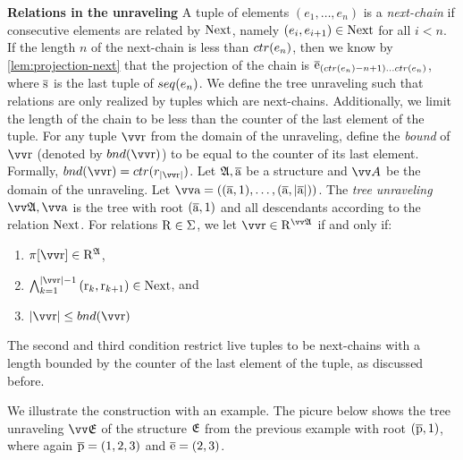 \noindent
\textbf{Relations in the unraveling}
A tuple of elements $(e_{1}, \ldots, e_{n})$ is a \emph{next-chain} if consecutive elements are related by $\mathrm{Next}$, namely $(e_{i}, e_{i+1}) \in \mathrm{Next}$ for all $i < n$.
If the length $n$ of the next-chain is less than $\ctr{e_{n}}$, then we know by \cref{lem:projection-next} that the projection of the chain is $\elemtuplee_{(\ctr{e_{n}}-n+1)\ldots{}\ctr{e_{n}}}$, where $\overline{\mathrm{s}}$ is the last tuple of $\seq{e_{n}}$.
We define the tree unraveling such that relations are only realized by tuples which are next-chains.
Additionally, we limit the length of the chain to be less than the counter of the last element of the tuple.
For any tuple $\elemtuptupler$ from the domain of the unraveling, define the \emph{bound} of $\elemtuptupler$ (denoted by $\bound{\elemtuptupler}$) to be equal to the counter of its last element.
Formally, $\bound{\elemtuptupler} = \ctr{r_{|\elemtuptupler|}}$.
Let ${\mathfrak{A}}, \overline{\mathrm{a}}$ be a structure and $\unraveldom{A}$ be the domain of the unraveling.
Let $\elemtuptuplea = ((\elemtuplea, 1), \ldots, (\elemtuplea, |\elemtuplea|))$.
The \emph{tree unraveling} $\unravel{A}, \elemtuptuplea$ is the tree with root $(\overline{\mathrm{a}}, 1)$ and all descendants according to the relation $\mathrm{Next}$.
For relations $\mathrm{R} \in \Sigma$, we let $\elemtuptupler \in \relR^{\unravel{A}}$ if and only if:\begin{enumerate}
  \item $\pi[\elemtuptupler] \in \relR^{\str{A}}$,
  \item $\bigwedge_{k=1}^{|\elemtuptupler|-1}{(\elemr_{k},\elemr_{k+1}) \in \relNext}$, and
  \item $|\elemtuptupler| \le \bound{\elemtuptupler}$
\end{enumerate}
The second and third condition restrict live tuples to be next-chains with a length bounded by the counter of the last element of the tuple, as discussed before.

We illustrate the construction with an example.
The picure below shows the tree unraveling $\unravel{E}$ of the structure ${\mathfrak{E}}$ from the previous example with root $(\overline{\mathrm{p}}, 1)$, where again $\overline{\mathrm{p}} = (1,2,3)$ and $\overline{\mathrm{e}} = (2,3)$.
\begin{figure}[H]
  \centering
  
\end{figure}


